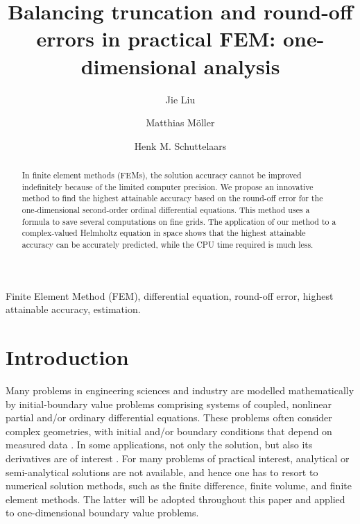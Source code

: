 \documentclass[review,3p]{elsarticle}
\begin{document}
\begin{frontmatter}

\title{Balancing truncation and round-off errors in practical FEM: one-dimensional analysis}

 \author[1]{Jie Liu}
 \author[1]{Matthias Möller}
 \author[1]{Henk M. Schuttelaars}
 
 \address[1]{Delft Institute of Applied Mathematics\\ Delft University of Technology\\ Van Mourik Broekmanweg 6, 2628 XE Delft, The Netherlands}

\begin{abstract}
In finite element methods (FEMs), the solution accuracy cannot be improved indefinitely because of the limited computer precision. We propose an innovative method to find the highest attainable accuracy based on the round-off error for the one-dimensional second-order ordinal differential equations. This method uses a formula to save several computations on fine grids. The application of our method to a complex-valued Helmholtz equation in space shows that the highest attainable accuracy can be accurately predicted, while the CPU time required is much less. 
\end{abstract}


\begin{keyword}
Finite Element Method (FEM), differential equation, round-off error, highest attainable accuracy, estimation.
\end{keyword}

\end{frontmatter}

\section{Introduction}

Many problems in engineering sciences and industry are modelled mathematically by initial-boundary value problems comprising systems of coupled, nonlinear partial and/or ordinary differential equations. These problems often consider complex geometries, with initial and/or boundary conditions that depend on measured data \cite{Kumar2016}. 
In some applications, not only the solution, but also its derivatives are of interest \cite{Kumar2016,carey1982derivative}.
For many problems of practical interest, analytical or semi-analytical solutions are not available, and hence one has to resort to numerical solution methods, such as the finite difference, finite volume, and finite element methods. The latter will be adopted throughout this paper and applied to one-dimensional boundary value problems.
\end{document}
